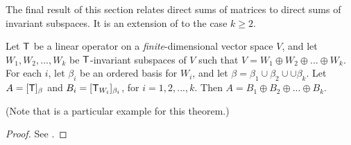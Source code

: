 The final result of this section relates direct sums of matrices to direct sums of invariant subspaces.
It is an extension of  to the case \(k \ge 2\).

\begin{theorem} \label{thm 5.24}
Let \(\textsf{T}\) be a linear operator on a \emph{finite}-dimensional vector space \(V\), and let \(W_1, W_2, ..., W_k\) be \(\textsf{T}\)-invariant subspaces of \(V\) such that \(V = W_1 \oplus W_2 \oplus ... \oplus W_k\).
For each \(i\), let \(\beta_i\) be an ordered basis for \(W_i\), and let \(\beta = \beta_1 \cup \beta_2 \cup \cup \beta_k\). Let \(A = [\textsf{T}]_{\beta}\) and \(B_i = [\textsf{T}_{W_i}]_{\beta_i}\), for \(i = 1, 2, ..., k\).
Then \(A = B_1 \oplus B_2 \oplus ... \oplus B_k\).

(Note that  is a particular example for this theorem.)
\end{theorem}

\begin{proof}
See .
\end{proof}
